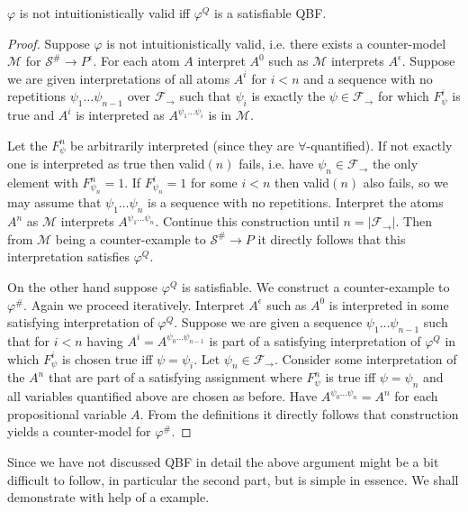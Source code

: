 \documentclass[a4paper,UKenglish,cleveref, autoref, thm-restate]{lipics-v2021}
\begin{document}
\begin{lemma}
	$\varphi$ is not intuitionistically valid iff $\varphi^Q$ is a satisfiable QBF.
\end{lemma}
\begin{proof}
	Suppose $\varphi$ is not intuitionistically valid, i.e. there exists a counter-model $\mathcal M$ for $\mathcal S^\#\to P^\epsilon$. For each atom $A$ interpret $A^0$ such as $\mathcal M$ interprets $A^\epsilon$. Suppose we are given interpretations of all atoms $A^i$ for $i < n$ and a sequence with no repetitions $\psi_1\dots\psi_{n-1}$ over $\mathcal F_\to$ such that $\psi_i$ is exactly the $\psi\in\mathcal F_\to$ for which $F_{\psi}^i$ is true and $A^i$ is interpreted as $A^{\psi_1\dots\psi_i}$ is in $\mathcal M$.
	
	Let the $F^{n}_\psi$ be arbitrarily interpreted (since they are $\forall$-quantified). If not exactly one is interpreted as true then valid$(n)$ fails, i.e. have $\psi_n\in\mathcal F_\to$ the only element with $F^n_{\psi_n} = 1$. If $F^i_{\psi_n} = 1$ for some $i < n$ then valid$(n)$ also fails, so we may assume that $\psi_1\dots\psi_n$ is a sequence with no repetitions. Interpret the atoms $A^n$ as $\mathcal M$ interprets $A^{\psi_1\dots\psi_n}$. Continue this construction until $n  = |\mathcal F_\to|$. Then from $\mathcal M$ being a counter-example to $\mathcal S^\#\to P$ it directly follows that this interpretation satisfies $\varphi^Q$.
	
	On the other hand suppose $\varphi^Q$ is satisfiable. We construct a counter-example to $\varphi^\#$.
	Again we proceed iteratively. Interpret $A^\epsilon$ such as $A^0$ is interpreted in some satisfying interpretation of $\varphi^Q$. Suppose we are given a sequence $\psi_1\dots \psi_{n-1}$ such that for $i<n$ having $A^i = A^{\psi_0\dots\psi_{n-1}}$ is part of a satisfying interpretation of $\varphi^Q$ in which $F^i_\psi$ is chosen true iff $\psi = \psi_i$. Let $\psi_n\in\mathcal F_\to$. Consider some interpretation of the $A^n$ that are part of a satisfying assignment where $F^n_\psi$ is true iff $\psi = \psi_n$ and all variables quantified above are chosen as before. Have $A^{\psi_0\dots\psi_n} = A^n$ for each propositional variable $A$. From the definitions it directly follows that construction yields a counter-model for $\varphi^\#$.
\end{proof}

Since we have not discussed QBF in detail the above argument might be a bit difficult to follow, in particular the second part, but is simple in essence. We shall demonstrate with help of a example.
\end{document}
